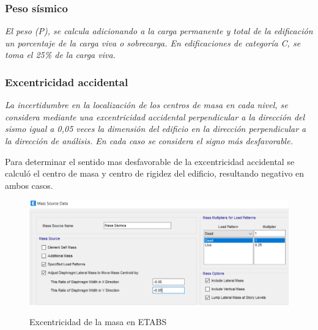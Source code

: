 \documentclass{article}%
\begin{document}
%
\subsubsection{Peso sísmico}%
\label{ssubsec:Pesossmico}%
\begin{tcolorbox}[colback=gray!5!white,colframe=Maroon!75!black,fonttitle=\bfseries,title=Art. 26]%
\textit{El peso (P), se calcula adicionando a la carga permanente y total de la edificación un porcentaje de la carga viva o sobrecarga. En edificaciones de categoría C, se toma el 25\% de la carga viva.}%
\end{tcolorbox}%

%
\subsubsection{Excentricidad accidental}%
\label{ssubsec:Excentricidadaccidental}%
\begin{tcolorbox}[colback=gray!5!white,colframe=Maroon!75!black,fonttitle=\bfseries,title=Art. 28.5]%
\textit{La incertidumbre en la localización de los centros de masa en cada nivel, se considera mediante una excentricidad accidental perpendicular a la dirección del sismo igual a 0,05 veces la dimensión del edificio en la dirección perpendicular a la dirección de análisis. En cada caso se considera el signo más desfavorable.}%
\end{tcolorbox}%
Para determinar el sentido mas desfavorable de la excentricidad accidental se calculó el centro de masa y centro de rigidez del edificio, resultando negativo en ambos casos.\\%


\begin{figure}[ht!]%
\centering%
\caption{Excentricidad de la masa en ETABS}%
\includegraphics[scale=0.7]{images/excentricidad.PNG}%
\label{masa}%
\end{figure}

%
\end{document}
